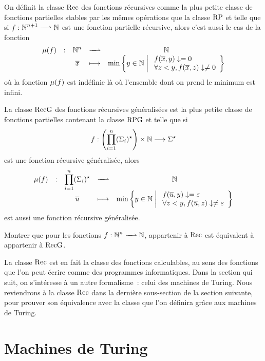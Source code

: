 \begin{definition}
  On définit la classe $\operatorname{Rec}$ des fonctions récursives comme la plus petite
  classe de fonctions partielles stables par les mêmes opérations
  que la classe $\operatorname{RP}$ et telle que si
  $\makeFunNamePartial{f}{\bN^{n+1}}{\bN}$ est une fonction partielle récursive,
  alors c'est aussi le cas de la fonction
  \[\makeFunPartial{\muC(f)}{\bN^n}{\bN}
                   {\vec x}{\min\compr{y \in \bN}{\begin{array}{l}
                         f(\vec x,y)\conveq 0 \\
                         \forall z < y, f(\vec x,z)\convneq 0\end{array}}}\]
  où la fonction $\mathbin{\mu}(f)$ est indéfinie là où l'ensemble dont on prend le
  minimum est infini.
  
  La classe $\operatorname{RecG}$ des fonctions récursives généralisées est la plus petite
  classe de fonctions partielles contenant la classe $\operatorname{RPG}$ et telle que si
  \[f : \displaystyle \left(\prod_{i = 1}^n (\Sigma_{i})^{\star}\right)\times\mathbb N \longrightarrow \Sigma^{\star}\]
  est une fonction récursive généralisée, alors
  \[\makeFunPartial{\muC(f)}{\prod_{i = 1}^n \toStAP{i}}{\bN}
                   {\vec{\varwd}}{\min\compr{y \in \bN}{\begin{array}{l}
                         f(\vec \varwd,y)\conveq \Ewd\\
                         \forall z < y, f(\vec \varwd,z)\convneq \Ewd
                   \end{array}}}\]
  est aussi une fonction récursive généralisée.
\end{definition}

\begin{exercise}
  Montrer que pour les fonctions $\makeFunNamePartial{f}{\bN^n}{\bN}$,
  appartenir à $\operatorname{Rec}$ est équivalent à appartenir à $\operatorname{RecG}$.
\end{exercise}

La classe $\operatorname{Rec}$ est en fait la classe des fonctions calculables, au sens des
fonctions que l'on peut écrire comme des programmes informatiques. Dans la
section qui suit, on s'intéresse à un autre formalisme~: celui des machines de
Turing. Nous reviendrons à la classe $\operatorname{Rec}$ dans la dernière sous-section de la
section suivante, pour prouver son équivalence avec la classe que l'on définira
grâce aux machines de Turing.

\section{Machines de Turing}

